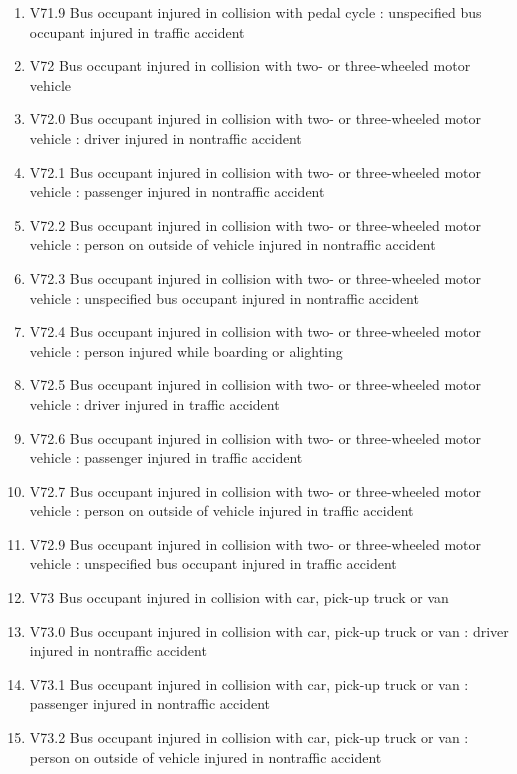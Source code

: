 \documentclass[
]{scrartcl}
\begin{document}
\begin{itemize}
\begin{enumerate}
  \item
    V71.9 Bus occupant injured in collision with pedal cycle :
    unspecified bus occupant injured in traffic accident
  \item
    V72 Bus occupant injured in collision with two- or three-wheeled
    motor vehicle
  \item
    V72.0 Bus occupant injured in collision with two- or three-wheeled
    motor vehicle : driver injured in nontraffic accident
  \item
    V72.1 Bus occupant injured in collision with two- or three-wheeled
    motor vehicle : passenger injured in nontraffic accident
  \item
    V72.2 Bus occupant injured in collision with two- or three-wheeled
    motor vehicle : person on outside of vehicle injured in nontraffic
    accident
  \item
    V72.3 Bus occupant injured in collision with two- or three-wheeled
    motor vehicle : unspecified bus occupant injured in nontraffic
    accident
  \item
    V72.4 Bus occupant injured in collision with two- or three-wheeled
    motor vehicle : person injured while boarding or alighting
  \item
    V72.5 Bus occupant injured in collision with two- or three-wheeled
    motor vehicle : driver injured in traffic accident
  \item
    V72.6 Bus occupant injured in collision with two- or three-wheeled
    motor vehicle : passenger injured in traffic accident
  \item
    V72.7 Bus occupant injured in collision with two- or three-wheeled
    motor vehicle : person on outside of vehicle injured in traffic
    accident
  \item
    V72.9 Bus occupant injured in collision with two- or three-wheeled
    motor vehicle : unspecified bus occupant injured in traffic accident
  \item
    V73 Bus occupant injured in collision with car, pick-up truck or van
  \item
    V73.0 Bus occupant injured in collision with car, pick-up truck or
    van : driver injured in nontraffic accident
  \item
    V73.1 Bus occupant injured in collision with car, pick-up truck or
    van : passenger injured in nontraffic accident
  \item
    V73.2 Bus occupant injured in collision with car, pick-up truck or
    van : person on outside of vehicle injured in nontraffic accident

\end{enumerate}
\end{itemize}
\end{document}
